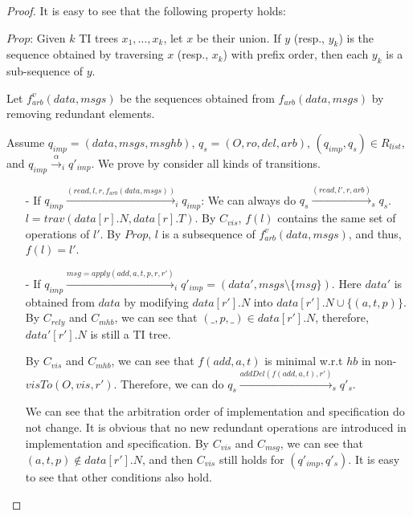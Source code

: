\begin {proof} 

It is easy to see that the following property holds: 

$\mathit{Prop}$: Given $k$ TI trees $x_1,\ldots,x_k$, let $x$ be their union. If $y$ (resp., $y_k$) is the sequence obtained by traversing $x$ (resp., $x_k$) with prefix order, then each $y_k$ is a sub-sequence of $y$.  

Let $f_{\mathit{arb}}^v(\mathit{data},\mathit{msgs})$ be the sequences obtained from $f_{\mathit{arb}}(\mathit{data},\mathit{msgs})$ by removing redundant elements. 

Assume $q_{\mathit{imp}} = (\mathit{data},\mathit{msgs},\mathit{msghb})$, $q_s = (O,\mathit{ro},\mathit{del},\mathit{arb})$, $(q_{\mathit{imp}},q_s) \in R_{\mathit{list}}$, and $q_{\mathit{imp}} \xrightarrow{\alpha}_i q'_{\mathit{imp}}$. We prove by consider all kinds of transitions. 

\begin{itemize}
\setlength{\itemsep}{0.5pt}
\item[-] If $q_{\mathit{imp}} \xrightarrow{( \mathit{read},l,r,f_{\mathit{arb}}(\mathit{data},\mathit{msgs}) )}_i q_{\mathit{imp}}$: We can always do $q_s \xrightarrow{( \mathit{read},l',r,\mathit{arb} )}_s q_s$. $l = \mathit{trav}(\mathit{data}[r].N, \mathit{data}[r].T)$. By $C_{\mathit{vis}}$, $f(l)$ contains the same set of operations of $l'$. By $\mathit{Prop}$, $l$ is a subsequence of $f_{\mathit{arb}}^v(\mathit{data},\mathit{msgs})$, and thus, $f(l) = l'$. 

\item[-] If $q_{\mathit{imp}} \xrightarrow{ \mathit{msg} = \mathit{apply}( \mathit{add},a,t,p,r,r' )}_i q'_{\mathit{imp}} = (\mathit{data}',\mathit{msgs} \setminus \{ \mathit{msg} \})$. Here $\mathit{data}'$ is obtained from $\mathit{data}$ by modifying $\mathit{data}[r'].N$ into $\mathit{data}[r'].N \cup \{ (a,t,p) \}$. By $C_{\mathit{rely}}$ and $C_{\mathit{mhb}}$, we can see that $(\_,p,\_) \in \mathit{data}[r'].N$, therefore, $\mathit{data}'[r'].N$ is still a TI tree. 
    
    By $C_{\mathit{vis}}$ and $C_{\mathit{mhb}}$, we can see that $f(\mathit{add},a,t)$ is minimal w.r.t $\mathit{hb}$ in non-$\mathit{visTo}(O,\mathit{vis},r')$. Therefore, we can do $q_s \xrightarrow{ \mathit{addDel}( f(\mathit{add},a,t),r' )}_s q'_s$. 
    
    We can see that the arbitration order of implementation and specification do not change. It is obvious that no new redundant operations are introduced in implementation and specification. By $C_{\mathit{vis}}$ and $C_{\mathit{msg}}$, we can see that $(a,t,p) \notin \mathit{data}[r'].N$, and then $C_{\mathit{vis}}$ still holds for $(q'_{\mathit{imp}},q'_s)$. It is easy to see that other conditions also hold. 



\end{itemize}
\end{proof}
